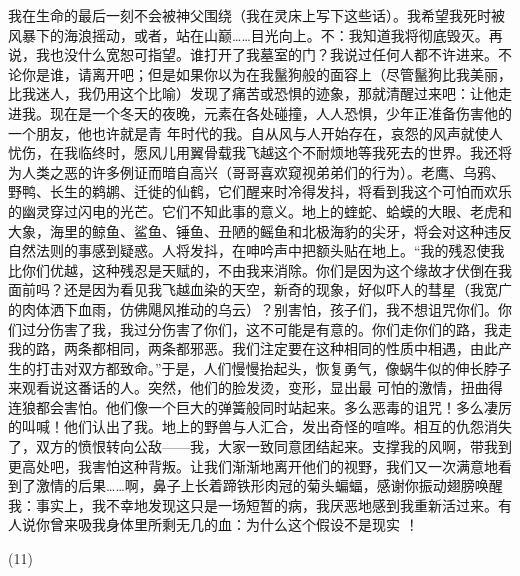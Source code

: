 \documentclass{article}
\begin{document}
我在生命的最后一刻不会被神父围绕（我在灵床上写下这些话）。我希望我死时被风暴下的海浪摇动，或者，站在山巅……目光向上。不：我知道我将彻底毁灭。再说，我也没什么宽恕可指望。谁打开了我墓室的门？我说过任何人都不许进来。不论你是谁，请离开吧；但是如果你以为在我鬣狗般的面容上（尽管鬣狗比我美丽，比我迷人，我仍用这个比喻）发现了痛苦或恐惧的迹象，那就清醒过来吧：让他走进我。现在是一个冬天的夜晚，元素在各处碰撞，人人恐惧，少年正准备伤害他的一个朋友，他也许就是青
\newpage
年时代的我。自从风与人开始存在，哀怨的风声就使人忧伤，在我临终时，愿风儿用翼骨载我飞越这个不耐烦地等我死去的世界。我还将为人类之恶的许多例证而暗自高兴（哥哥喜欢窥视弟弟们的行为）。老鹰、乌鸦、野鸭、长生的鹈鹕、迁徙的仙鹤，它们醒来时冷得发抖，将看到我这个可怕而欢乐的幽灵穿过闪电的光芒。它们不知此事的意义。地上的蝰蛇、蛤蟆的大眼、老虎和大象，海里的鲸鱼、鲨鱼、锤鱼、丑陋的鳐鱼和北极海豹的尖牙，将会对这种违反自然法则的事感到疑惑。人将发抖，在呻吟声中把额头贴在地上。“我的残忍使我比你们优越，这种残忍是天赋的，不由我来消除。你们是因为这个缘故才伏倒在我面前吗？还是因为看见我飞越血染的天空，新奇的现象，好似吓人的彗星（我宽广的肉体洒下血雨，仿佛飓风推动的乌云）？别害怕，孩子们，我不想诅咒你们。你们过分伤害了我，我过分伤害了你们，这不可能是有意的。你们走你们的路，我走我的路，两条都相同，两条都邪恶。我们注定要在这种相同的性质中相遇，由此产生的打击对双方都致命。”于是，人们慢慢抬起头，恢复勇气，像蜗牛似的伸长脖子来观看说这番话的人。突然，他们的脸发烫，变形，显出最
\newpage
可怕的激情，扭曲得连狼都会害怕。他们像一个巨大的弹簧般同时站起来。多么恶毒的诅咒！多么凄厉的叫喊！他们认出了我。地上的野兽与人汇合，发出奇怪的喧哗。相互的仇怨消失了，双方的愤恨转向公敌——我，大家一致同意团结起来。支撑我的风啊，带我到更高处吧，我害怕这种背叛。让我们渐渐地离开他们的视野，我们又一次满意地看到了激情的后果……啊，鼻子上长着蹄铁形肉冠的菊头蝙蝠，感谢你振动翅膀唤醒我：事实上，我不幸地发现这只是一场短暂的病，我厌恶地感到我重新活过来。有人说你曾来吸我身体里所剩无几的血：为什么这个假设不是现实
！ 


(11) 
\end{document}
